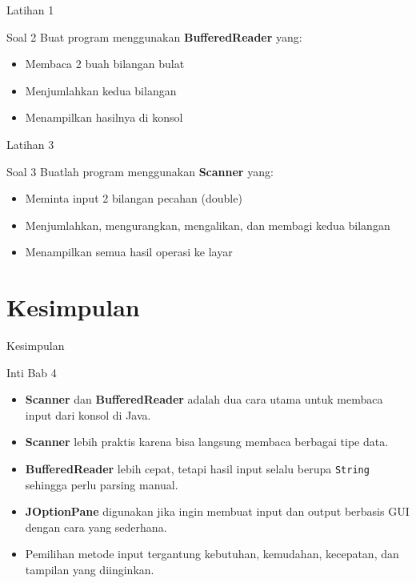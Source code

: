 \documentclass{beamer}
\begin{document}
\begin{frame}{Latihan 1}
  \begin{block}{Soal 2}
    Buat program menggunakan \textbf{BufferedReader} yang:
    \begin{itemize}
      \item Membaca 2 buah bilangan bulat
      \item Menjumlahkan kedua bilangan
      \item Menampilkan hasilnya di konsol
    \end{itemize}
  \end{block}
\end{frame}

\begin{frame}{Latihan 3}
  \begin{block}{Soal 3}
    Buatlah program menggunakan \textbf{Scanner} yang:
    \begin{itemize}
      \item Meminta input 2 bilangan pecahan (double)
      \item Menjumlahkan, mengurangkan, mengalikan, dan membagi kedua bilangan
      \item Menampilkan semua hasil operasi ke layar
    \end{itemize}
  \end{block}
\end{frame}

\section{Kesimpulan}
\begin{frame}{Kesimpulan}
  \begin{alertblock}{Inti Bab 4}
    \begin{itemize}
      \item \textbf{Scanner} dan \textbf{BufferedReader} adalah dua cara utama untuk membaca input dari konsol di Java.
      \item \textbf{Scanner} lebih praktis karena bisa langsung membaca berbagai tipe data.
      \item \textbf{BufferedReader} lebih cepat, tetapi hasil input selalu berupa \texttt{String} sehingga perlu parsing manual.
      \item \textbf{JOptionPane} digunakan jika ingin membuat input dan output berbasis GUI dengan cara yang sederhana.
      \item Pemilihan metode input tergantung kebutuhan, kemudahan, kecepatan, dan tampilan yang diinginkan.
    \end{itemize}
  \end{alertblock}
\end{frame}
\end{document}
